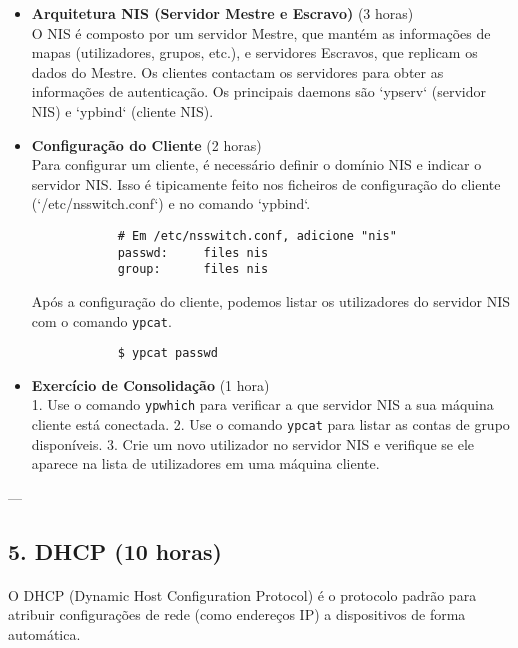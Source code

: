 \documentclass[10pt,a4paper]{article}
\begin{document}
	\begin{itemize}
		\item \textbf{Arquitetura NIS (Servidor Mestre e Escravo)} (3 horas) \\
		O NIS é composto por um servidor Mestre, que mantém as informações de mapas (utilizadores, grupos, etc.), e servidores Escravos, que replicam os dados do Mestre. Os clientes contactam os servidores para obter as informações de autenticação. Os principais daemons são `ypserv` (servidor NIS) e `ypbind` (cliente NIS).
		
		\item \textbf{Configuração do Cliente} (2 horas) \\
		Para configurar um cliente, é necessário definir o domínio NIS e indicar o servidor NIS. Isso é tipicamente feito nos ficheiros de configuração do cliente (`/etc/nsswitch.conf`) e no comando `ypbind`.
		\begin{verbatim}
			# Em /etc/nsswitch.conf, adicione "nis"
			passwd:     files nis
			group:      files nis
		\end{verbatim}
		Após a configuração do cliente, podemos listar os utilizadores do servidor NIS com o comando \texttt{ypcat}.
		\begin{verbatim}
			$ ypcat passwd
		\end{verbatim}
		
		\item \textbf{Exercício de Consolidação} (1 hora) \\
		1. Use o comando \texttt{ypwhich} para verificar a que servidor NIS a sua máquina cliente está conectada.
		2. Use o comando \texttt{ypcat} para listar as contas de grupo disponíveis.
		3. Crie um novo utilizador no servidor NIS e verifique se ele aparece na lista de utilizadores em uma máquina cliente.
	\end{itemize}
	
	---
	
	\subsection*{5. DHCP (10 horas)}
	\vspace{-1.2em}
	\paragraph{}
	O DHCP (Dynamic Host Configuration Protocol) é o protocolo padrão para atribuir configurações de rede (como endereços IP) a dispositivos de forma automática.
	
\end{document}
